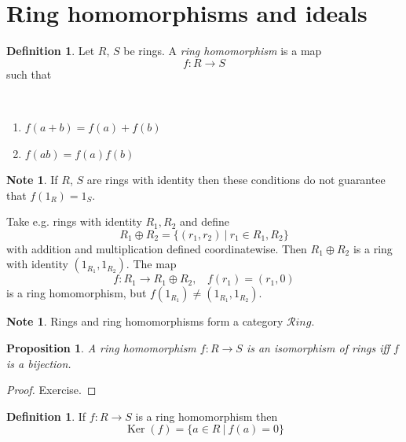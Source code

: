 \documentclass[12pt, letterpaper, oneside]{article}
\theoremstyle{plain}
\newtheorem{proposition}[theorem]{Proposition}
\theoremstyle{definition}
\newtheorem{definition}[theorem]{Definition}
\newtheorem{note}[theorem]{Note}
\newcommand{\Ker}{\operatorname{Ker}}
\newcommand{\Ring}{{\mathcal Ring}}
\newcommand{\benu}{\begin{enumerate}}
\newcommand{\eenu}{\end{enumerate}}
\newcommand{\vs}{\vskip 5mm}
\begin{document}
\newpage
\section{Ring homomorphisms and ideals}
\label{SEC_RINGSHOMIDEALS}

\begin{definition}
Let $R$, $S$ be rings. A \emph{ring homomorphism} is a map 
$$f\colon R\to S$$
such that 

\vskip -13mm

\ 
\benu
\item $f(a+b) = f(a)+f(b)$
\item $f(ab) = f(a)f(b)$
\eenu
\end{definition}


\vs\vs

\begin{note}
If $R$, $S$ are rings with identity then these conditions do not guarantee 
that $f(1_{R}) = 1_{S}$. 

Take e.g. rings  with identity $R_{1}, R_{2}$ and define
$$R_{1}\oplus R_{2} = \{(r_{1}, r_{2}) \ | \ r_{1}\in R_{1}, R_{2}\}$$
with addition and multiplication defined coordinatewise. Then $R_{1}\oplus R_{2}$
is a ring with identity $(1_{R_{1}}, 1_{R_{2}})$. The map  
$$f\colon R_{1} \to R_{1}\oplus R_{2}, \ \ \ \ f(r_{1}) = (r_{1}, 0) $$
is a ring homomorphism, but $f(1_{R_{1}}) \neq (1_{R_{1}}, 1_{R_{2}})$.
\end{note}

\vs\vs

\begin{note}
Rings and ring homomorphisms form a category $\Ring$.
\end{note}

\vs\vs

\begin{proposition}
A ring homomorphism $f\colon R\to S$ is an isomorphism of rings iff $f$ is a bijection. 
\end{proposition}

\vs

\begin{proof}
Exercise.
\end{proof}


\vs\vs

\begin{definition}
If $f\colon R\to S$ is a ring homomorphism then 
$$\Ker(f) = \{a\in R \ | \ f(a) = 0\}$$
\end{definition}

\vs\vs
\end{document}
